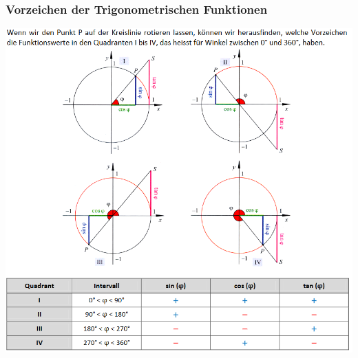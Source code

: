 \subsubsection{Vorzeichen der Trigonometrischen Funktionen}
\includegraphics[scale=0.7]{einheitskreis4.PNG}

